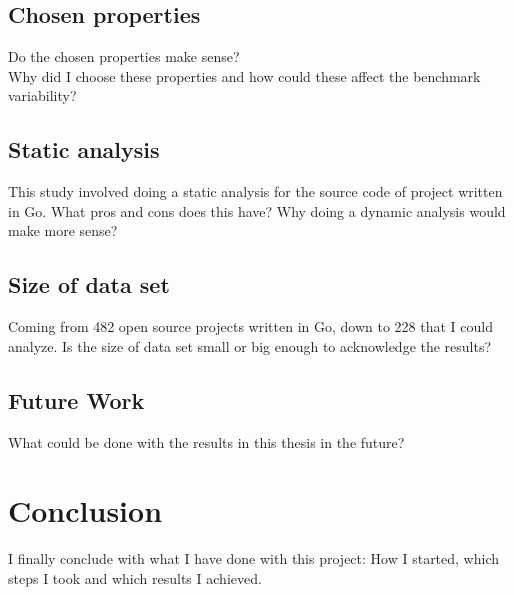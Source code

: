 \documentclass{seal_thesis}
\begin{document}
\section{Chosen properties}
Do the chosen properties make sense? \\
Why did I choose these properties and how could these affect the benchmark variability? \\

\section{Static analysis}
This study involved doing a static analysis for the source code of project written in Go. What pros and cons does this have? Why doing a dynamic analysis would make more sense?

\section{Size of data set}
Coming from 482 open source projects written in Go, down to 228 that I could analyze. Is the size of data set small or big enough to acknowledge the results?

\section{Future Work}
What could be done with the results in this thesis in the future?

\chapter{Conclusion}
\label{Conclusion}
I finally conclude with what I have done with this project: How I started, which steps I took and which results I achieved.


\backmatter


\end{document}
